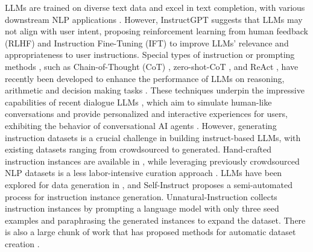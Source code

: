  LLMs are trained on diverse text data and excel in text completion, with various downstream NLP applications \cite{brown2020language,chowdhery2022palm,hoffmann2022chinchilla,zhang2022opt,touvron2023llama}. However, InstructGPT suggests that LLMs may not align with user intent, proposing reinforcement learning from human feedback (RLHF) \cite{christiano2017deep} and Instruction Fine-Tuning (IFT) \cite{wei2021flan} to improve LLMs' relevance and appropriateness to user instructions.
Special types of instruction or prompting methods , such as Chain-of-Thought (CoT) \cite{wei2022chain}, zero-shot-CoT \cite{kojima2022large}, and ReAct \cite{yao2023react}, have recently been developed to enhance the performance of LLMs on reasoning, arithmetic and decision making tasks \cite{zhou2022least,wang2023self,imani2023mathprompter,lu2023dynamic,fu2022complexity,shi2022language,hendrycks2021measuring,lewkowycz2022solving,zhang2023automatic,ho2022large,zhang2023multimodal,shinn2023reflexion,zelikman2022star,creswell2022selection,nye2021show,sridhar2023hierarchical}.
These techniques underpin the impressive capabilities of recent dialogue LLMs \cite{shuster2022blenderbot,thoppilan2022lamda,glaese2022improving,bai2022training,openai_chatgpt,bubeck2023sparks}, which aim to simulate human-like conversations and provide personalized and interactive experiences for users, exhibiting the behavior of conversational AI agents \cite{gao2018neural}. However, generating instruction datasets is a crucial challenge in building instruct-based LLMs, with existing datasets ranging from crowdsourced to generated. Hand-crafted instruction instances are available in \cite{supernaturalinstructions}, while leveraging previously crowdsourced NLP datasets is a less labor-intensive curation approach \cite{wei2021flan,longpre2023flan,naturalinstructions,iyer2022opt}. LLMs have been explored for data generation in \cite{schick-schutze-2021-generating,lee2021neural,liu-etal-2022-wanli,alpaca}, and Self-Instruct \cite{wang2022self} proposes a semi-automated process for instruction instance generation. Unnatural-Instruction \cite{honovich2022unnatural} collects instruction instances by prompting a language model with only three seed examples and paraphrasing the generated instances to expand the dataset. There is also a large chunk of work that has proposed methods for automatic dataset creation \cite{li2022controllable,kim2022soda,chen2023places,meng2022generating,chen2022weakly,sahu2022data,kim2021linda,rosenbaum2022linguist,Zhang2020GroundedCG,kulhanek2021augpt,Zhang2020DialogueDO,Papangelis2021GenerativeCN,bae2020}.
